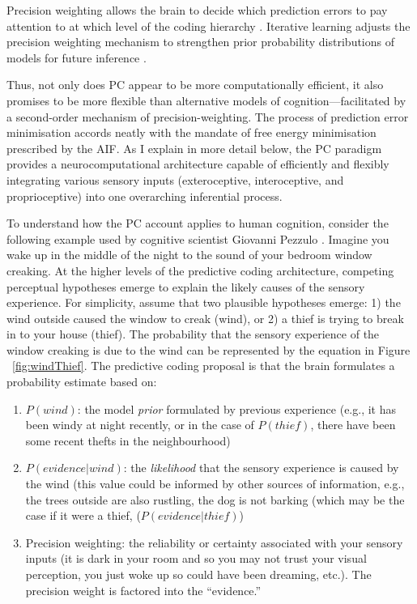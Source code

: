 \begin{CJK}{UTF8}{gbsn}
Precision weighting allows the brain to decide which prediction errors to pay attention to at which level of the coding hierarchy \citep[be it high and conceptual or deep and sensory][]{Friston2015}.  Iterative learning adjusts the precision weighting mechanism to strengthen prior probability distributions of models for future inference \citep{Robbins1964}.

Thus, not only does PC appear to be more computationally efficient, it also promises to be more flexible than alternative models of cognition---facilitated by a second-order mechanism of precision-weighting.  The process of prediction error minimisation accords neatly with the mandate of free energy minimisation prescribed by the AIF.  As I explain in more detail below, the PC paradigm provides a neurocomputational architecture capable of efficiently and flexibly integrating various sensory inputs (exteroceptive, interoceptive, and proprioceptive) into one overarching inferential process.


To understand how the PC account applies to human cognition, consider the following example used by cognitive scientist Giovanni Pezzulo \textcite{Pezzulo2013}.  Imagine you wake up in the middle of the night to the sound of your bedroom window creaking.  At the higher levels of the predictive coding architecture, competing perceptual hypotheses emerge to explain the likely causes of the sensory experience.  For simplicity, assume that two plausible hypotheses emerge: 1) the wind outside caused the window to creak (wind), or 2) a thief is trying to break in to your house (thief).  The probability that the sensory experience of the window creaking is due to the wind can be represented by the equation in Figure ~\ref{fig:windThief}.  The predictive coding proposal is that the brain formulates a probability estimate based on:

\begin{enumerate}
  \item $P(wind)$: the model \textit{prior} formulated by previous experience (e.g., it has been windy at night recently, or in the case of $P(thief)$, there have been some recent thefts in the neighbourhood)
  \item $P(evidence|wind)$: the \textit{likelihood} that the sensory experience is caused by the wind (this value could be informed by other sources of information, e.g., the trees outside are also rustling, the dog is not barking (which may be the case if it were a thief, ($P(evidence|thief)$)
  \item Precision weighting: the reliability or certainty associated with your sensory inputs (it is dark in your room and so you may not trust your visual perception, you just woke up so could have been dreaming, etc.).  The precision weight is factored into the ``evidence.''
\end{enumerate}



\end{CJK}
